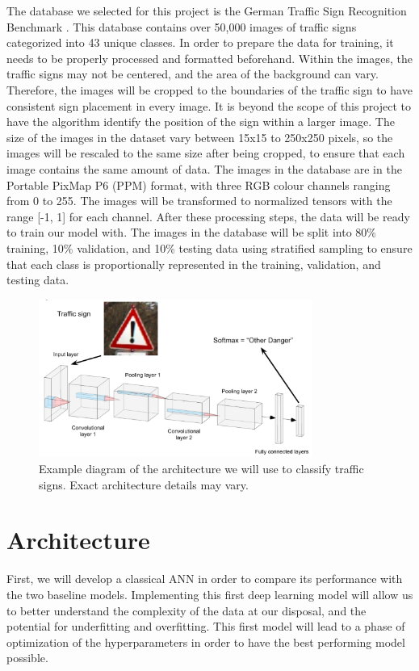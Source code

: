 \documentclass{article} %
\begin{document}
The database we selected for this project is the German Traffic Sign Recognition Benchmark \citep{Stallkamp-IJCNN-2011}. This database contains over 50,000 images of traffic signs categorized into 43 unique classes. In order to prepare the data for training, it needs to be properly processed and formatted beforehand. Within the images, the traffic signs may not be centered, and the area of the background can vary. Therefore, the images will be cropped to the boundaries of the traffic sign to have consistent sign placement in every image. It is beyond the scope of this project to have the algorithm identify the position of the sign within a larger image. The size of the images in the dataset vary between 15x15 to 250x250 pixels, so the images will be rescaled to the same size after being cropped, to ensure that each image contains the same amount of data. The images in the database are in the Portable PixMap P6 (PPM) format, with three RGB colour channels ranging from 0 to 255. The images will be transformed to normalized tensors with the range [-1, 1] for each channel. After these processing steps, the data will be ready to train our model with. The images in the database will be split into 80\% training, 10\% validation, and 10\% testing data using stratified sampling to ensure that each class is proportionally represented in the training, validation, and testing data.

\begin{figure}[h]
\begin{center}
\includegraphics[width=0.8\textwidth]{Figs/APS360.png}
\end{center}
\caption{Example diagram of the architecture we will use to classify traffic signs. Exact architecture details may vary.}
\label{fig:CNN}
\end{figure}


\section{Architecture}
First, we will develop a classical ANN in order to compare its performance with the two baseline models. Implementing this first deep learning model will allow us to better understand the complexity of the data at our disposal, and the potential for underfitting and overfitting. This first model will lead to a phase of optimization of the hyperparameters in order to have the best performing model possible. 
\end{document}
